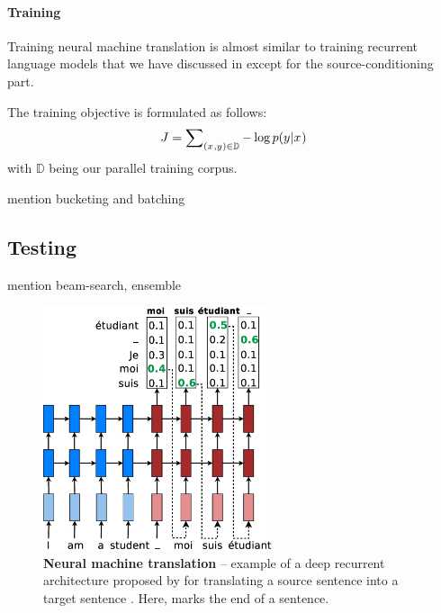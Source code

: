 \paragraph{Training}
Training neural machine translation is almost similar to training recurrent
language models that we have discussed in  except for the
source-conditioning part.

The training objective is formulated as follows:
\begin{equation}
J = \sum_{(x_{},y_{}) \in \mathbb{D}} \nolimits -\log p(y_{}|x_{})
\label{e:j_t}
\end{equation}
with $\mathbb{D}$ being our parallel training corpus.

mention bucketing and batching

\subsection{Testing}

mention beam-search, ensemble

\begin{figure}[tbh!]
\centering
\includegraphics[width=0.6\textwidth, clip=true, trim= 0 0 0
0]{img/nmt_test.eps} %
\caption[Neural machine translation]{{\bf Neural machine translation} -- example of a deep recurrent
architecture proposed by  for
translating a source sentence  into a target sentence
. Here, \word{\texttt{\_}} marks the end of a sentence.
} 
\label{f:nmt_test}
\end{figure}


%

